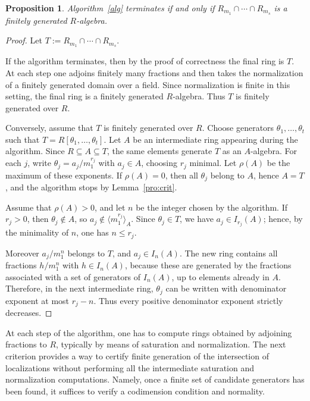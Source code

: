 \documentclass{amsart}
\newtheorem{proposition}[theorem]{Proposition}
\theoremstyle{definition}
\theoremstyle{remark}
\begin{document}
\begin{proposition}
\label{prop:termination}
Algorithm~\ref{alg} terminates if and only if
$R_{m_1}\cap\cdots\cap R_{m_s}$ is a finitely generated $R$-algebra.
\end{proposition}

\begin{proof}
Let $T:=R_{m_1}\cap\cdots\cap R_{m_s}$.

If the algorithm terminates, then by the proof of correctness the final ring is
$T$. At each step one adjoins finitely many fractions and then takes the
normalization of a finitely generated domain over a field. Since normalization
is finite in this setting, the final ring is a finitely generated
$R$-algebra. Thus $T$ is finitely generated over $R$.

Conversely, assume that $T$ is finitely generated over $R$. Choose
generators $\theta_1,\dots,\theta_t$ such that $T=R[\theta_1,\dots,\theta_t]$.
Let $A$ be an intermediate ring appearing during the algorithm. Since
$R\subseteq A\subseteq T$, the same elements generate $T$ as an
$A$-algebra.
For each $j$, write $\theta_j=a_j/m_1^{r_j}$ with $a_j\in A$, choosing
$r_j$ minimal. Let $\rho(A)$ be the maximum of these exponents. If
$\rho(A)=0$, then all $\theta_j$ belong to $A$, hence $A=T$, and the algorithm
stops by Lemma~\ref{pro:crit}.

Assume that $\rho(A)>0$, and let $n$ be the integer chosen by the algorithm.
If $r_j>0$, then $\theta_j\notin A$, so $a_j\notin \langle m_1^{r_j}\rangle_A$.
Since $\theta_j\in T$, we have $a_j\in I_{r_j}(A)$; hence, by the minimality
of $n$, one has $n\leq r_j$.

Moreover $a_j/m_1^n$ belongs to $T$, and $a_j\in I_n(A)$. The new ring
contains all fractions $h/m_1^n$ with $h\in I_n(A)$, because these are
generated by the fractions associated with a set of generators of $I_n(A)$,
up to elements already in $A$. Therefore, in the next intermediate ring,
$\theta_j$ can be written with denominator exponent at most $r_j-n$.
Thus every positive denominator exponent strictly decreases.
\end{proof}

At each step of the algorithm, one has to compute rings obtained by adjoining
fractions to $R$, typically by means of saturation and normalization. The next
criterion provides a way to certify finite generation of the intersection of
localizations without performing all the intermediate saturation and
normalization computations. Namely, once a finite set of candidate generators
has been found, it suffices to verify a codimension condition and normality.
\end{document}
